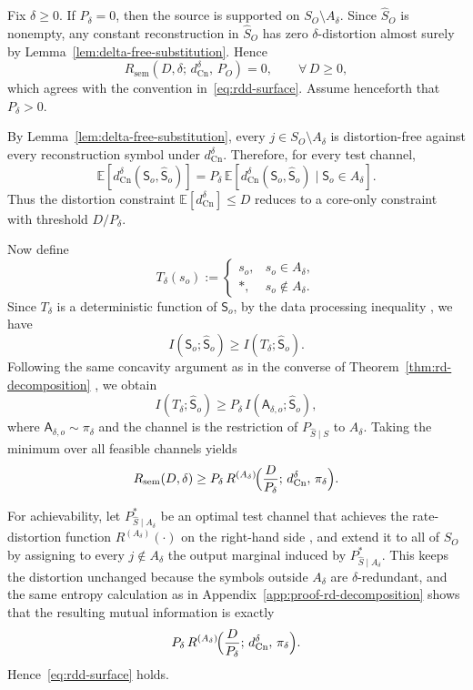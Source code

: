 \documentclass[journal,onecolumn]{IEEEtran}
\makeatletter
\newcommand{\Cn}{\text{Cn}}
\newcommand{\E}{\mathbb{E}}
\numberwithin{equation}{section}
\renewenvironment{proof}[1][\proofname]{\par
  \pushQED{\qed}%
  \normalfont \topsep6\p@\@plus6\p@\relax
  \trivlist
  \item[\hskip\labelsep
        \itshape
    #1\@addpunct{.}]\ignorespaces
}{%
  \popQED\endtrivlist\@endpefalse
}
\makeatother
\begin{document}
\begin{proof}
Fix \(\delta\ge 0\).
If \(P_\delta=0\), then the source is supported on
\(S_O\setminus A_\delta\). Since \(\hat S_O\) is nonempty, any
constant reconstruction in \(\hat S_O\) has zero \(\delta\)-distortion
almost surely by Lemma~\ref{lem:delta-free-substitution}. Hence
\[
  R_{\mathrm{sem}}(D,\delta;\,d_{\Cn}^{\delta},\,P_O)=0,
  \qquad \forall\,D\ge 0,
\]
which agrees with the convention in~\eqref{eq:rdd-surface}.
Assume henceforth that \(P_\delta>0\).

By Lemma~\ref{lem:delta-free-substitution}, every
\(j\in S_O\setminus A_\delta\) is distortion-free against every
reconstruction symbol under \(d_{\Cn}^{\delta}\).
Therefore, for every test channel,
\[
  \E[d_{\Cn}^{\delta}({\mathsf{S}}_o,\hat {\mathsf{S}}_o)]
  =
  P_\delta\,
  \E[d_{\Cn}^{\delta}({\mathsf{S}}_o,\hat {\mathsf{S}}_o)\mid {\mathsf{S}}_o\in A_\delta].
\]
Thus the distortion constraint
\(\E[d_{\Cn}^{\delta}]\le D\) reduces to a
core-only constraint with threshold \(D/P_\delta\).

Now define
\[
  T_\delta(s_o)
  :=
  \begin{cases}
    s_o, & s_o\in A_\delta,\\
    *,   & s_o\notin A_\delta.
  \end{cases}
\]
Since \(T_\delta\) is a deterministic function of \({\mathsf{S}}_o\), 
by the data processing inequality \cite[Ch.~2]{cover2006elements},
we have
\[
  I({\mathsf{S}}_o;\hat {\mathsf{S}}_o)\ge I(T_\delta;\hat {\mathsf{S}}_o).
\]
Following the same concavity argument as in the converse of
Theorem~\ref{thm:rd-decomposition}
\cite[Ch.~2]{cover2006elements}\cite[Ch.~1]{csiszar2011information}, we obtain
\[
  I(T_\delta;\hat {\mathsf{S}}_o)
  \ge
  P_\delta\,
  I(\mathsf{A}_{\delta,o};\hat{\mathsf{S}}_o),
\]
where \(\mathsf{A}_{\delta,o}\sim\pi_\delta\) and the channel is the
restriction of \(P_{\hat S\mid S}\) to \(A_\delta\).
Taking the minimum over all feasible channels yields
\[
  R_{\mathrm{sem}}(D,\delta)
  \ge
  P_\delta\,
  R^{(A_\delta)}\!\Bigl(\frac{D}{P_\delta};\,
  d_{\Cn}^{\delta},\,\pi_\delta\Bigr).
\]

For achievability, let
\(P_{\hat S\mid A_\delta}^*\) be an optimal test channel that achieves
the rate-distortion function \(R^{(A_\delta)}(\cdot)\) on the right-hand side
\cite[Ch.~10]{cover2006elements}
\cite[Ch.~7]{csiszar2011information},
and extend it to all of \(S_O\) by assigning to every
\(j\notin A_\delta\) the output marginal induced by
\(P_{\hat S\mid A_\delta}^*\).
This keeps the distortion unchanged because the symbols outside
\(A_\delta\) are \(\delta\)-redundant, and the same entropy
calculation as in Appendix~\ref{app:proof-rd-decomposition} shows that
the resulting mutual information is exactly
\[
  P_\delta\,
  R^{(A_\delta)}\!\Bigl(\frac{D}{P_\delta};\,
  d_{\Cn}^{\delta},\,\pi_\delta\Bigr).
\]
Hence~\eqref{eq:rdd-surface} holds.
\end{proof}
\end{document}
